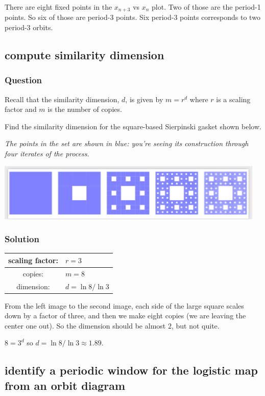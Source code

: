 \documentclass[12pt,letterpaper,noanswers]{exam}
\begin{document}
There are eight fixed points in the $x_{n+3}$ vs $x_n$ plot.  Two of those are the period-1 points.  So six of those are period-3 points.  Six period-3 points corresponds to two period-3 orbits.

\subsection{compute similarity dimension}
\subsubsection{Question}
Recall that the similarity dimension, $d$, is given by $m = r^d$ where $r$ is a scaling factor and $m$ is the number of copies.

Find the similarity dimension for the square-based Sierpinski gasket shown below.  

\emph{The points in the set are shown in blue: you're seeing its construction through four iterates of the process.}


\includegraphics[width=\textwidth]{img/C29-2019-11-13p2.png}

\subsubsection{Solution}

\begin{tabular}{|c|p{3cm}|}
\hline
scaling factor: & $r = 3$ \\
\hline
copies: & $m=8$ \\
\hline
dimension: & $d=\ln 8/\ln 3$ \\
\hline
\end{tabular}


\vspace{0.1cm}

From the left image to the second image, each side of the large square scales down by a factor of three, and then we make eight copies (we are leaving the center one out).  So the dimension should be almost $2$, but not quite.

$8 = 3^d$ so $d = \ln 8/\ln 3 \approx 1.89$.

\subsection{identify a periodic window for the logistic map from an orbit diagram}
\end{document}
